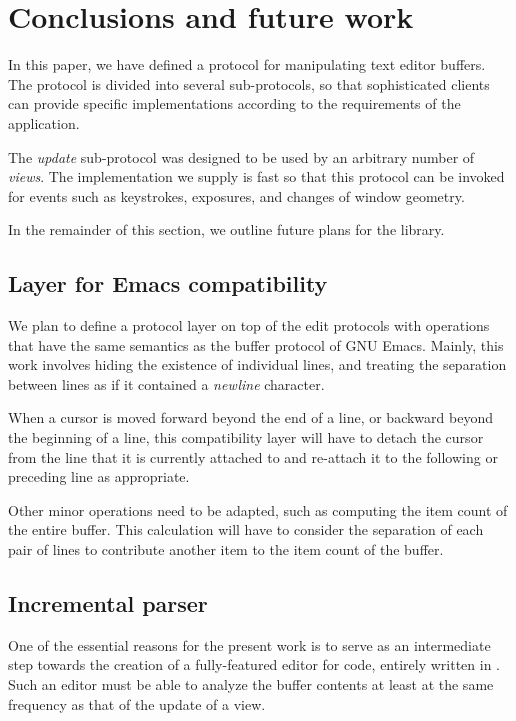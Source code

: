 \section{Conclusions and future work}

In this paper, we have defined a \clos{} protocol for manipulating
text editor buffers.  The protocol is divided into several
sub-protocols, so that sophisticated clients can provide specific
implementations according to the requirements of the application.

The \emph{update} sub-protocol was designed to be used by an arbitrary
number of \emph{views}.  The implementation we supply is fast so that
this protocol can be invoked for events such as keystrokes, exposures,
and changes of window geometry.

In the remainder of this section, we outline future plans for the
library.

\subsection{Layer for Emacs compatibility}

We plan to define a protocol layer on top of the edit protocols with
operations that have the same semantics as the buffer protocol of GNU
Emacs.  Mainly, this work involves hiding the existence of individual
lines, and treating the separation between lines as if it contained a
\emph{newline} character.

When a cursor is moved forward beyond the end of a line, or backward
beyond the beginning of a line, this compatibility layer will have to
detach the cursor from the line that it is currently attached to and
re-attach it to the following or preceding line as appropriate.

Other minor operations need to be adapted, such as computing the item
count of the entire buffer.  This calculation will have to consider
the separation of each pair of lines to contribute another item to the
item count of the buffer.

\subsection{Incremental \commonlisp{} parser}

One of the essential reasons for the present work is to serve as an
intermediate step towards the creation of a fully-featured editor for
\commonlisp{} code, entirely written in \commonlisp{}.  Such an editor
must be able to analyze the buffer contents at least at the same
frequency as that of the update of a view.

